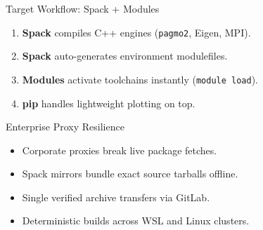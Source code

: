 \documentclass{beamer}
\begin{document}
\begin{frame}{Target Workflow: Spack + Modules}
  \begin{enumerate}
    \item \textbf{Spack} compiles C++ engines (\texttt{pagmo2}, Eigen, MPI).
    \item \textbf{Spack} auto-generates environment modulefiles.
    \item \textbf{Modules} activate toolchains instantly (\texttt{module load}).
    \item \textbf{pip} handles lightweight plotting on top.
  \end{enumerate}
\end{frame}

\begin{frame}{Enterprise Proxy Resilience}
  \begin{itemize}
    \item Corporate proxies break live package fetches.
    \item Spack mirrors bundle exact source tarballs offline.
    \item Single verified archive transfers via GitLab.
    \item Deterministic builds across WSL and Linux clusters.
  \end{itemize}
\end{frame}
\end{document}
